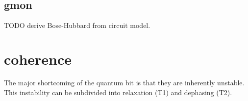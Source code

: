 \subsection{gmon}
TODO derive Bose-Hubbard from circuit model.

\section{coherence}
The major shortcoming of the quantum bit is that they are inherently unstable.
This instability can be subdivided into relaxation (T1) and dephasing (T2).











